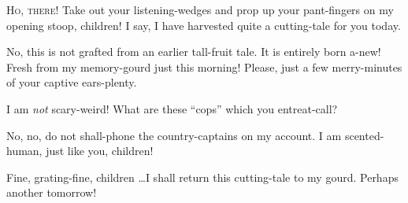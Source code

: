 
\lettrine{H}{o, there!}
Take out your listening-wedges and prop up your pant-fingers
on my opening stoop, children! I say, I have harvested quite a
cutting-tale for you today.

No, this is not grafted from an earlier tall-fruit tale. It is entirely
born a-new! Fresh from my memory-gourd just this morning! Please, just a
few merry-minutes of your captive ears-plenty.

I am \emph{not} scary-weird! What are these ``cops'' which you
entreat-call?

No, no, do not shall-phone the country-captains on my account. I am
scented-human, just like you, children!

Fine, grating-fine, children \ldots I shall return this cutting-tale to my
gourd. Perhaps another tomorrow!
